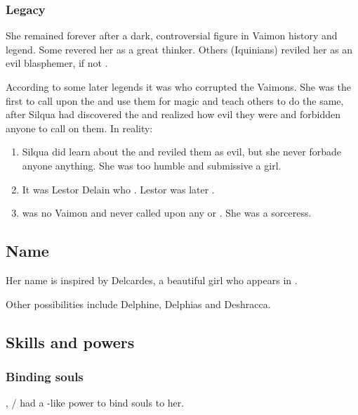 \subsubsection{Legacy}
She remained forever after a dark, controversial figure in Vaimon history and legend. 
Some revered her as a great thinker. 
Others (Iquinians) reviled her as an evil blasphemer, if not . 

According to some later legends it was \Delphine who corrupted the Vaimons.
She was the first to call upon the \qliphoth and use them for magic and teach others to do the same, after Silqua had discovered the \qliphoth and realized how evil they were and forbidden anyone to call on them.
In reality:
\begin{enumerate}
  \item 
    Silqua did learn about the \qliphoth and reviled them as evil, but she never forbade anyone anything.
    She was too humble and submissive a girl.
  \item 
    It was Lestor Delain who . 
    Lestor was later . 
  \item 
    \Delphine was no Vaimon and never called upon any \sephirah or \qliphah.
    She was a \Sarun sorceress.
\end{enumerate}










\subsection{Name}
Her name is inspired by Delcardes, a beautiful girl who appears in \cite{RobertEHoward:TheCatandtheSkull}. 

Other possibilities include Delphine, Delphias and Deshracca.









\subsection{Skills and powers}





\subsubsection{Binding souls}
\index{\carcer!\Delphine}
, \Shiaraid{}/\Delphine{} had a \sephirah-like power to bind souls to her. 

